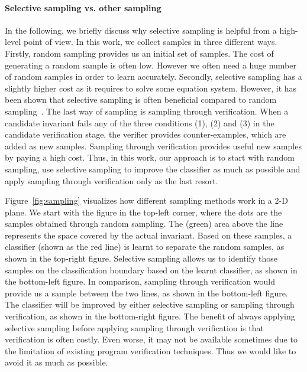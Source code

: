 \paragraph{Selective sampling vs. other sampling} In the following, we briefly discuss why selective sampling is helpful from a high-level point of view. In this work, we collect samples in three different ways. Firstly, random sampling provides us an initial set of samples. The cost of generating a random sample is often low. However we often need a huge number of random samples in order to learn accurately. Secondly, selective sampling has a slightly higher cost as it requires to solve some equation system. However, it has been shown that selective sampling is often beneficial compared to random sampling~\cite{DBLP:conf/mm/TongC01,DBLP:journals/jmlr/TongK01}. The last way of sampling is sampling through verification. When a candidate invariant fails any of the three conditions (1), (2) and (3) in the candidate verification stage, the verifier provides counter-examples, which are added as new samples. Sampling through verification provides useful new samples by paying a high cost. Thus, in this work, our approach is to start with random sampling, use selective sampling to improve the classifier as much as possible and apply sampling through verification only as the last resort.

Figure~\ref{fig:sampling} visualizes how different sampling methods work in a 2-D plane. We start with the figure in the top-left corner, where the dots are the samples obtained through random sampling. The (green) area above the line represents the space covered by the actual invariant. Based on these samples, a classifier (shown as the red line) is learnt to separate the random samples, as shown in the top-right figure. Selective sampling allows us to identify those samples on the classification boundary based on the learnt classifier, as shown in the bottom-left figure. In comparison, sampling through verification would provide us a sample between the two lines, as shown in the bottom-left figure. The classifier will be improved by either selective sampling or sampling through verification, as shown in the bottom-right figure. The benefit of always applying selective sampling before applying sampling through verification is that verification is often costly. Even worse, it may not be available sometimes due to the limitation of existing program verification techniques. Thus we would like to avoid it as much as possible.

